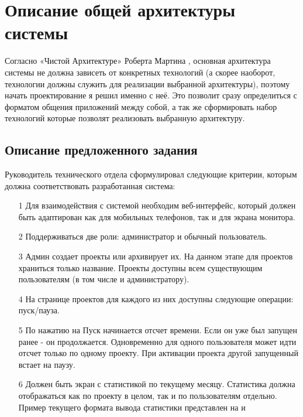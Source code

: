 \chapter{Описание общей архитектуры системы} \label{ch1}

Согласно «Чистой Архитектуре» Роберта Мартина \cite{clean-archecture-book}, основная архитектура системы не должна зависеть от конкретных технологий (а скорее наоборот, технологии должны служить для реализации выбранной архитектуры), поэтому начать проектирование я решил именно с неё. Это позволит сразу определиться с форматом общения приложений между собой, а так же сформировать набор технологий которые позволят реализовать выбранную архитектуру. 

\section{Описание предложенного задания} \label{ch1:sec1}

Руководитель технического отдела сформулировал следующие критерии, которым должна соответствовать разработанная система:

\begin{enumerate}
	\item[1] Для взаимодействия с системой необходим веб-интерфейс, который должен быть адаптирован как для мобильных телефонов, так и для экрана монитора.
	\item[2] Поддерживаться две роли: администратор и обычный пользователь.
	\item[3] Админ создает проекты или архивирует их. На данном этапе для проектов храниться только название. Проекты доступны всем существующим пользователям (в том числе и администратору).
	\item[4] На странице проектов для каждого из них доступны следующие операции: пуск/пауза. 
	\item[5] По нажатию на Пуск начинается отсчет времени. Если он уже был запущен ранее - он продолжается. Одновременно для одного пользователя может идти отсчет только по одному проекту. При активации проекта другой запущенный встает на паузу.
	\item[6] Должен быть экран с статистикой по текущему месяцу. Статистика должна отображаться как по проекту в целом, так и по пользователям отдельно. Пример текущего формата вывода статистики представлен на  и 
\end{enumerate} 

\newpage

